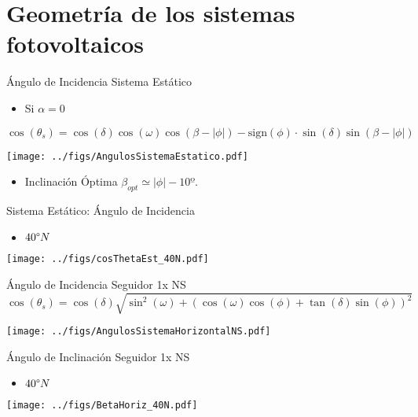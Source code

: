 \documentclass[aspectratio=169, usenames,svgnames,dvipsnames]{beamer}
\begin{document}
\section{Geometría de los sistemas fotovoltaicos}
\label{sec:org047a371}
\begin{frame}[label={sec:orge004958},plain]{Ángulo de Incidencia Sistema Estático}
\begin{itemize}
\item Si \(\alpha=0\)
\end{itemize}
\[
\cos(\theta_{s}) = \cos(\delta)\cos(\omega)\cos(\beta-|\phi|)- \mathrm{sign}(\phi)\cdot\sin(\delta)\sin(\beta-|\phi|)
\]

\begin{center}
\texttt{[image: ../figs/AngulosSistemaEstatico.pdf]}
\end{center}

\begin{itemize}
\item Inclinación Óptima \(\beta_{opt} \simeq |\phi| - 10º\).
\end{itemize}
\end{frame}

\begin{frame}[label={sec:org2f6fa82}]{Sistema Estático: Ángulo de Incidencia}
\begin{itemize}
\item \(40\degree N\)
\end{itemize}
\begin{center}
\texttt{[image: ../figs/cosThetaEst\_40N.pdf]}
\end{center}
\end{frame}



\begin{frame}[label={sec:orgca22380},plain]{Ángulo de Incidencia Seguidor 1x NS}
\[\cos(\theta_{s})=\cos(\delta)\sqrt{\sin^{2}(\omega)+\left(\cos(\omega)\cos(\phi)+\tan(\delta)\sin(\phi)\right)^{2}}\]

\begin{center}
\texttt{[image: ../figs/AngulosSistemaHorizontalNS.pdf]}
\end{center}
\end{frame}

\begin{frame}[label={sec:orgaf0ef49}]{Ángulo de Inclinación Seguidor 1x NS}
\begin{itemize}
\item \(40\degree N\)
\end{itemize}
\begin{center}
\texttt{[image: ../figs/BetaHoriz\_40N.pdf]}
\end{center}
\end{frame}
\end{document}
